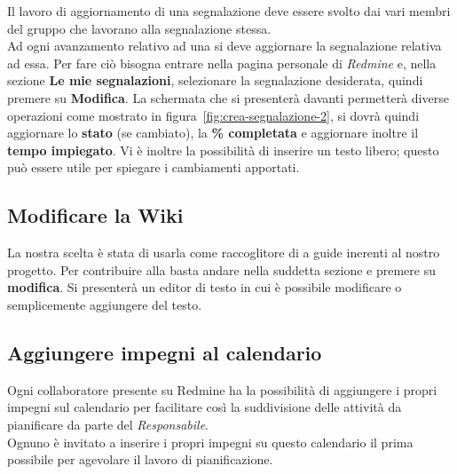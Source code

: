 \documentclass{scalatekids-article}
\begin{document}
Il lavoro di aggiornamento di una segnalazione deve essere svolto dai vari
membri del gruppo che lavorano alla segnalazione stessa.\\ Ad ogni avanzamento
relativo ad una  si deve aggiornare la segnalazione relativa ad
essa. Per fare ciò bisogna entrare nella pagina personale di \textit{Redmine} e,
nella sezione \textbf{Le mie segnalazioni}, selezionare la segnalazione
desiderata, quindi premere su \textbf{Modifica}. La schermata che si presenterà
davanti permetterà diverse operazioni come mostrato in figura~\ref{fig:crea-segnalazione-2},
si dovrà quindi aggiornare lo \textbf{stato} (se
cambiato), la \textbf{\% completata} e aggiornare inoltre il \textbf{tempo
  impiegato}. Vi è inoltre la possibilità di inserire un testo libero; questo
può essere utile per spiegare i cambiamenti apportati.

\subsection{Modificare la Wiki}

La nostra scelta è stata di usarla come raccoglitore di  a guide inerenti al nostro progetto.
Per contribuire alla  basta andare nella suddetta sezione e premere su \textbf{modifica}. Si presenterà un editor di testo in cui è possibile modificare o semplicemente aggiungere del testo.

\subsection{Aggiungere impegni al calendario}

Ogni collaboratore presente su Redmine ha la possibilità di aggiungere i propri impegni sul calendario per facilitare così la suddivisione delle attività da pianificare da parte del \textit{Responsabile}.\\
Ognuno è invitato a inserire i propri impegni su questo calendario il prima possibile per agevolare il lavoro di pianificazione.

\listoffigures
\end{document}
